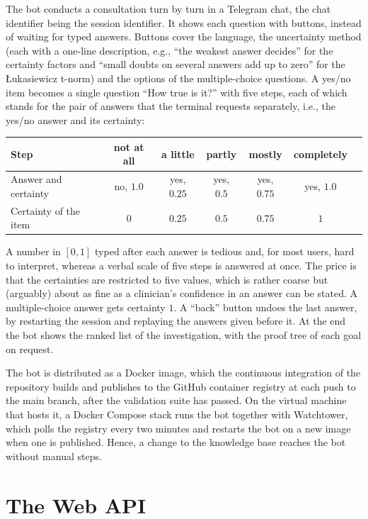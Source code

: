 The bot conducts a consultation turn by turn in a Telegram chat, the chat
identifier being the session identifier. It shows each question with buttons, instead of waiting for typed answers. Buttons cover the language, the uncertainty method (each with a one-line
description, e.g., ``the weakest answer decides'' for the certainty factors and
``small doubts on several answers add up to zero'' for the \L{}ukasiewicz
t-norm) and the options of the multiple-choice questions. A yes/no item becomes
a single question ``How true is it?'' with five steps, each of which stands for
the pair of answers that the terminal requests separately, i.e., the yes/no
answer and its certainty:
\begin{center}
\small
\begin{tabular}{@{}lcccccc@{}}
\toprule
Step & not at all & a little & partly & mostly & completely \\
\midrule
Answer and certainty & no, $1.0$ & yes, $0.25$ & yes, $0.5$ & yes, $0.75$ & yes, $1.0$ \\
Certainty of the item & $0$ & $0.25$ & $0.5$ & $0.75$ & $1$ \\
\bottomrule
\end{tabular}
\end{center}
A number in $[0,1]$ typed after each answer is tedious and, for most users,
hard to interpret, whereas a verbal scale of five steps is answered at once.
The price is that the certainties are restricted to five values, which is
rather coarse but (arguably) about as fine as a clinician's confidence in an answer can
be stated. A multiple-choice answer gets certainty $1$. A ``back''
button undoes the last answer, by restarting the session and replaying the
answers given before it. At the end the bot shows the ranked list of the investigation,
with the proof tree of each goal on request.

The bot is distributed as a Docker image, which the continuous integration of
the repository builds and publishes to the GitHub container registry at each
push to the main branch, after the validation suite has passed. On the virtual
machine that hosts it, a Docker Compose stack runs the bot together with
Watchtower, which polls the registry every two minutes and restarts the bot on
a new image when one is published. Hence, a change to the knowledge base
reaches the bot without manual steps.

\section{The Web API}

